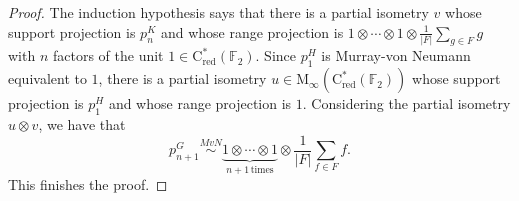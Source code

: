 \documentclass[a4paper,leqno,12pt]{article}
\numberwithin{equation}{section}
\theoremstyle{plain}
\theoremstyle{definition}
\theoremstyle{remark}
\newcommand{\Csr}{\mathrm{C}^*_{\text{red}}}
\begin{document}
\begin{proof}
		The induction hypothesis says that there is a partial isometry $v$ whose support projection is $p_n^{K}$ and whose range projection is 
		$1 \otimes \cdots \otimes 1\otimes \frac{1}{|F|}{\sum_{g\in F}{g}}$ with $n$ factors of the unit $1 \in \Csr(\mathbb F_2)$. Since $p_1^{H}$ is Murray-von Neumann equivalent to $1$, there is a partial isometry $u \in \mathrm M_\infty(\Csr(\mathbb F_2))$ whose support projection is $p_1^H$ and whose range projection is $1$. Considering the partial isometry $u\otimes v$, we have that
		\[
			p_{n+1}^{G}  \stackrel{MvN}{\sim} \underbrace{1\otimes \cdots \otimes 1}_{n+1 \, {\text{times}}}\otimes \frac{1}{|F|}{\sum_{f\in F}{f}}.
		\]
		This finishes the proof.
  \end{proof}

		
		
%
		
		
		
\end{document}

